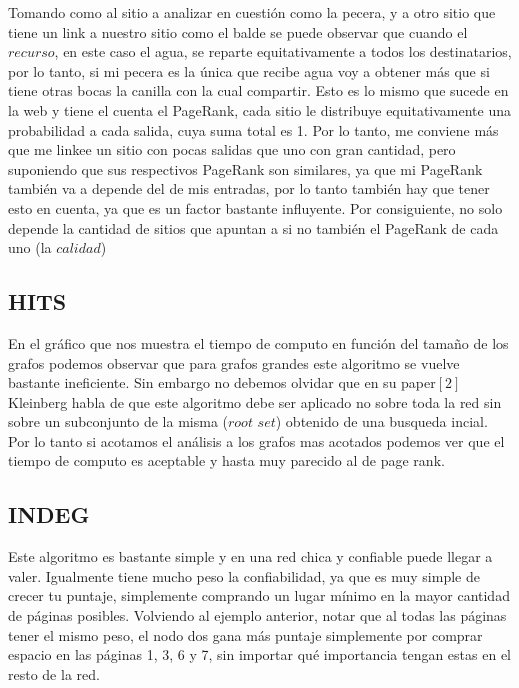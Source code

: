 \FloatBarrier

Tomando como al sitio a analizar en cuestión como la pecera, y a otro sitio que tiene un link a nuestro sitio como el balde se puede observar que cuando el $\textit{recurso}$, en este caso el agua, se reparte equitativamente a todos los destinatarios, por lo tanto, si mi pecera es la única que recibe agua voy a obtener más que si tiene otras bocas la canilla con la cual compartir. Esto es lo mismo que sucede en la web y tiene el cuenta el PageRank, cada sitio le distribuye equitativamente una probabilidad a cada salida, cuya suma total es 1. Por lo tanto, me conviene más que me linkee un sitio con pocas salidas que uno con gran cantidad, pero suponiendo que sus respectivos PageRank son similares, ya que mi PageRank también va a depende del de mis entradas, por lo tanto también hay que tener esto en cuenta, ya que es un factor bastante influyente. Por consiguiente, no solo depende la cantidad de sitios que apuntan a si no también el PageRank de cada uno (la  $\textit{calidad}$)

\newpage


\subsection{HITS}

En el gráfico que nos muestra el tiempo de computo en función del tamaño de los grafos podemos observar que para grafos grandes este algoritmo se vuelve bastante ineficiente. Sin embargo no debemos olvidar que en su paper$[2]$ Kleinberg habla de que este algoritmo debe ser aplicado no sobre toda la red sin sobre un subconjunto de la misma ($\textit{root set}$) obtenido de una busqueda incial. Por lo tanto si acotamos el análisis a los grafos mas acotados podemos ver que el tiempo de computo es aceptable y hasta muy parecido al de page rank. 

\subsection{INDEG}

Este algoritmo es bastante simple y en una red chica y confiable puede llegar a valer. Igualmente tiene mucho peso la confiabilidad, ya que es muy simple de crecer tu puntaje, simplemente comprando un lugar mínimo en la mayor cantidad de páginas posibles. Volviendo al ejemplo anterior, notar que al todas las páginas tener el mismo peso, el nodo dos gana más puntaje simplemente por comprar espacio en las páginas 1, 3, 6 y 7, sin importar qué importancia tengan estas en el resto de la red.

